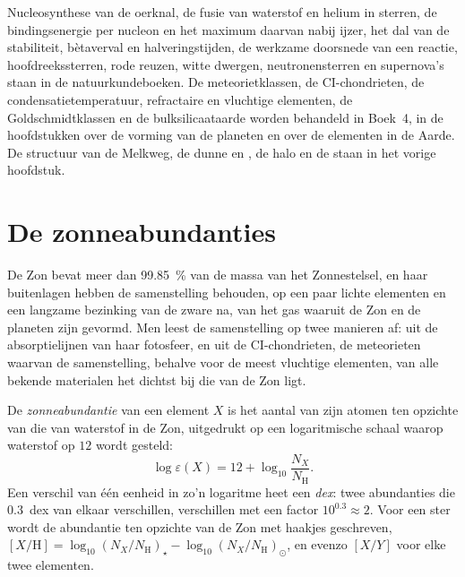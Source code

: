 \begin{recall}
Nucleosynthese van de oerknal, de fusie van waterstof en helium in sterren,
de bindingsenergie per nucleon en het maximum daarvan nabij ijzer, het dal van
de stabiliteit, bètaverval en halveringstijden, de werkzame doorsnede van een reactie,
hoofdreekssterren, rode reuzen, witte dwergen, neutronensterren en
supernova's staan in de natuurkundeboeken. De meteorietklassen, de
CI-chondrieten, de condensatietemperatuur, refractaire en vluchtige
elementen, de Goldschmidtklassen en de bulksilicaataarde worden
behandeld in Boek~4, in de hoofdstukken over de vorming van de planeten en over
de elementen in de Aarde. De structuur van de Melkweg, de dunne en
, de halo en de  staan in het vorige
hoofdstuk.
\end{recall}

\section{De zonneabundanties}\label{sec:b3:origin-of-elements:solar}

De Zon bevat meer dan \qty{99.85}{\percent} van de massa van het
Zonnestelsel, en haar buitenlagen hebben de samenstelling behouden, op een paar
lichte elementen en een langzame bezinking van de zware na, van het gas waaruit
de Zon en de planeten zijn gevormd. Men leest de samenstelling op twee manieren af:
uit de absorptielijnen van haar fotosfeer, en uit de CI-chondrieten,
de meteorieten waarvan de samenstelling, behalve voor de meest vluchtige
elementen, van alle bekende materialen het dichtst bij die van de Zon ligt.

\begin{definition}\label{def:b3:origin-of-elements:abundance}
De \emph{zonneabundantie} van een element $X$ is
het aantal van zijn atomen ten opzichte van die van waterstof in de Zon,
uitgedrukt op een logaritmische schaal waarop waterstof op $12$ wordt gesteld:
\[
\log\varepsilon(X) = 12 + \log_{10}\frac{N_X}{N_\mathrm{H}} .
\]
Een verschil van één eenheid in zo'n logaritme heet een
\emph{dex}: twee abundanties die $0.3$~dex van elkaar verschillen,
verschillen met een factor $10^{0.3} \approx 2$. Voor een ster wordt de abundantie ten opzichte van de
Zon met haakjes geschreven,
$[X/\mathrm{H}] = \log_{10}(N_X/N_\mathrm{H})_\star -
\log_{10}(N_X/N_\mathrm{H})_\odot$, en evenzo $[X/Y]$ voor elke twee
elementen.
\end{definition}


